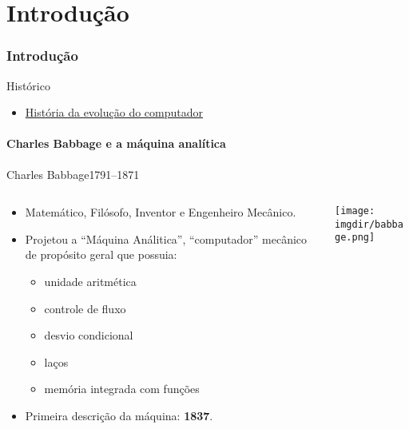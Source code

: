 
\frame{\maketitle}

\def\parttitle{Introdução}
\part{\parttitle}
\frame{\frametitle{\parttitle}\tableofcontents[part=1]}

\section{Introdução}

\begin{frame}{Histórico}
  \begin{itemize}
  \item
    \href{http://www.computerhistory.org/timeline/?category=cmptr}{História
      da evolução do computador}
  \end{itemize}
\end{frame}



\subsection{Charles Babbage e a máquina analítica}

\begin{frame}{Charles Babbage}{1791--1871}
  \small
  \begin{columns}
    \begin{column}{.6\textwidth}
      \begin{itemize}
        \item Matemático, Filósofo, Inventor e Engenheiro Mecânico.
        \item Projetou a ``Máquina Análitica'', ``computador''
          mecânico de propósito geral que possuia:
          \begin{itemize}
          \item unidade aritmética
          \item controle de fluxo
          \item desvio condicional
          \item laços
          \item memória integrada com funções
      \end{itemize}
        \item Primeira descrição da máquina: {\bf 1837}.
      \end{itemize}
    \end{column}
    \begin{column}{.4\textwidth}
    \texttt{[image: \\imgdir/babbage.png]}
    \end{column}
  \end{columns}
\end{frame}

